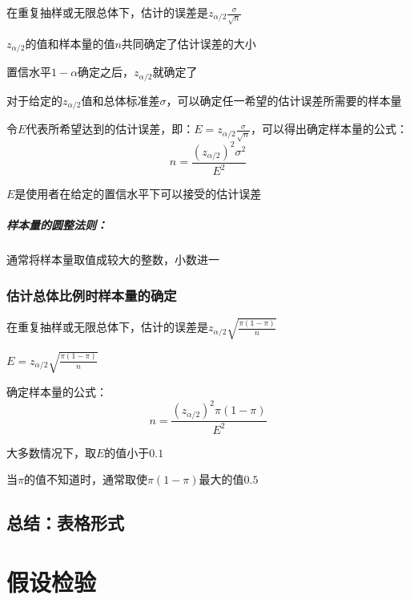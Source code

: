 \documentclass[UTF8,10pt]{book}
\begin{document}
                {\kaishu 在重复抽样或无限总体下，估计的误差是$z_{\alpha/2}  \frac{\sigma}{\sqrt{n}}$
                
                $z_{\alpha/2}$的值和样本量的值$n$共同确定了估计误差的大小
                
                置信水平$1-\alpha$确定之后，$z_{\alpha/2}$就确定了
                
                对于给定的$z_{\alpha/2}$值和总体标准差$\sigma$，可以确定任一希望的估计误差所需要的样本量}

                令$E$代表所希望达到的估计误差，即：$E = z_{\alpha/2}  \frac{\sigma}{\sqrt{n}}$，可以得出确定样本量的公式：
                    $$ n =  \frac{(z_{\alpha/2})^2 \sigma^2}{E^2}$$

                $E$是使用者在给定的置信水平下可以接受的估计误差

                \paragraph{样本量的圆整法则：}通常将样本量取值成较大的整数，小数进一

            \subsection{估计总体比例时样本量的确定}
                    
            {\kaishu 在重复抽样或无限总体下，估计的误差是$z_{\alpha/2}  \sqrt{\frac{\pi(1-\pi)}{n}}$

            $E = z_{\alpha/2}  \sqrt{\frac{\pi(1-\pi)}{n}}$}

            确定样本量的公式：
                $$ n =  \frac{(z_{\alpha/2})^2 \pi (1-\pi)}{E^2}$$

            {\kaishu 大多数情况下，取$E$的值小于$0.1$
            
            当$\pi$的值不知道时，通常取使$\pi(1-\pi)$最大的值$0.5$}

        \section{总结：表格形式}


\clearpage
\chapter{假设检验}
\end{document}
